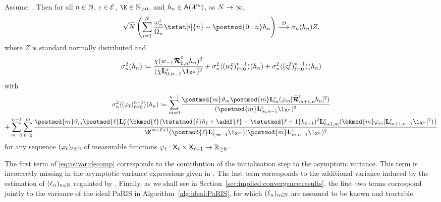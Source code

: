 \begin{theorem} \label{cor:clt:pseudo:marginal:paris}
Assume~. Then for all $n \in \mathbb{N}$, $\varepsilon \in \mathcal{E}$, $\K \in \nsetpos$, and $h_n \in \mathsf{A}(\mathcal{X}^n)$, as $N \to \infty$, 
$$
 \sqrt{\N} \left( \sum_{i = 1}^\N \frac{\ewght{n}{i}}{\sumwght{n}} \tstat[i]{n} - \postmod{0:n} h_n  \right) 
  \dlim \sigma_n(h_n) Z, 
$$
where $Z$ is standard normally distributed and 
\begin{equation} \label{eq:as:var:decomp}
\sigma^2_n (h_n) \eqdef \frac{\chi(\initwgtfunc \retrokmodmodnorm_{0, n} h_n)^2}{(\chi \ukmod{0, n - 1} \1_{\Xset^n})^2} + \sigma^2_n \langle (\wgtfuncmod{\ell})_{\ell = 0}^{n - 1} \rangle (h_n) + \sigma^2_n \langle (\ukestvar{\ell})_{\ell = 0}^{n - 1} \rangle (h_n) 
\end{equation}
with
\begin{multline} \label{eq:non-recursive:as:var}
\sigma^2_n \langle (\varphi_\ell)_{\ell = 0}^{n - 1} \rangle (h_n) 
\eqdef \sum_{m = 0}^{n - 1} \frac{\postmod{m} \adjfuncforward{m} \postmod{m} \ukmod{m}(\varphi_m [\retrokmodmodnorm_{m + 1, n} h_n ]^2)}{(\postmod{m} \ukmod{m, n - 1} \1_{\Xset^n})^2}\\
+ \sum_{m = 0}^{n - 1} \sum_{\ell = 0}^m \frac{\postmod{m} \adjfuncforward{m} \postmod{\ell} \ukmod{\ell} \{\bkmod{\ell}(\tstatmod{\ell} h_{\ell} + \addf{\ell} - \tstatmod{\ell + 1} h_{\ell +1})^2 \ukmod{\ell + 1, m}( \bkmod{m} \varphi_m [\ukmod{m + 1, n - 1} \1_{\Xset^n}]^2
)\}}{\K^{m - \ell + 1} (\postmod{\ell} \ukmod{\ell, m - 1} \1_{\Xset^m})(\postmod{m} \ukmod{m, n - 1} \1_{\Xset^n})^2}
\end{multline}
for any sequence $(\varphi_\ell)_{\ell \in \mathbb{N}}$ of measurable functions $\varphi_\ell : \mathsf{X}_\ell \times \mathsf{X}_{\ell + 1} \to \mathbb{R}_{\geq 0}$. 
\end{theorem}

\begin{remark}
The first term of \eqref{eq:as:var:decomp} corresponds to the contribution of the initialisation step to the asymptotic variance. This term is incorrectly missing in the asymptotic-variance expressions given in \cite[Theorem~3 and Corollary~5]{olsson:westerborn:2017}. The last term corresponds to the additional variance induced by the estimation of $(\ell_{n})_{n \in \mathbb{N}}$ regulated by . Finally, as we shall see in Section~\ref{sec:implied:convergence:results}, the first two terms correspond jointly to the variance of the ideal PaRIS in Algorithm~\ref{alg:ideal:PaRIS}, for which $(\ell_{n})_{n \in \mathbb{N}}$ are assumed to be known and tractable. 
\end{remark}

